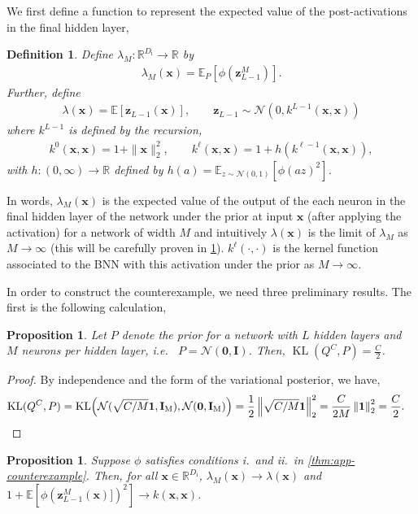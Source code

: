 \documentclass[twoside]{article}
\renewcommand{\ss}[1]{_{\text{#1}}}
\newcommand{\vnull}{\mathbf{0}}
\newcommand{\vx}{\mathbf{x}}
\newcommand{\vz}{\mathbf{z}}
\newcommand{\mI}{\mathbf{I}}
\newcommand{\E}{\mathbb{E}}
\renewcommand{\P}{\mathbb{P}}
\newcommand{\Q}{\mathbb{Q}}
\renewcommand{\Q}{\ensuremath{Q}}
\renewcommand{\P}{\ensuremath{P}}
\newcommand{\R}{\mathbb{R}}
\newcommand{\KL}{\operatorname{KL}}
\newcommand{\Normal}{\mathcal{N}}
\renewcommand{\ss}[1]{_{\text{#1}}}        %
\DeclarePairedDelimiter\parens{(}{)}             %
\theoremstyle{theoremstyle}
\newtheorem{definition}[theorem]{Definition}
\newtheorem{proposition}[theorem]{Proposition}
\begin{document}
We first define a function to represent the expected value of the post-activations in the final hidden layer,
\begin{definition}
Define $ \lambda_M\colon \R^{D\ss{i}} \to \R$ by
\begin{align}
    \lambda_M(\vx) = \E_{\P}[\phi(\vz_{L-1}^{M})].
\end{align}
Further, define
\begin{align}
    \lambda(\vx) = \E[
    \vz_{L-1}(\vx)], \qquad \vz_{L-1} \sim \Normal(0, k^{L-1}(\vx,\vx))
\end{align}
where $k^{L-1}$ is defined by the recursion,
\begin{align}\label{eqn:kernel-recursion}
    k^0(\vx,\vx) = 1 + \|\vx\|^2_2, \qquad k^{\ell}(\vx,\vx) = 1 + h(k^{\ell-1}(\vx,\vx)),
\end{align}
with $h\colon (0,\infty) \to \R$ defined by $h(a) = \E_{z\sim \Normal(0,1)}[\phi(az)^2]$. 
\end{definition}
In words, $\lambda_M(\vx)$ is the expected value of the output of the each neuron in the final hidden layer of the network under the prior at input $\vx$ (after applying the activation) for a network of width $M$ and intuitively $\lambda(\vx)$ is the limit of $\lambda_M$ as $M \to \infty$ (this will be carefully proven in \cref{prop:convergence-lambda}). $k^\ell(\cdot, \cdot)$ is the kernel function associated to the BNN with this activation under the prior as $M \to \infty$.


In order to construct the counterexample, we need three preliminary results. The first is the following calculation, 

\begin{proposition}
\label{prop:kl-to-prior}
Let $\P$ denote the prior for a network with $L$ hidden layers and $M$ neurons per hidden layer, i.e.~ $\P = \Normal(\vnull, \mI)$. Then, $\KL(\Q^C,\P) = \tfrac{C}{2}$.
\end{proposition}
\begin{proof}
By independence  and the form of the variational posterior, we have, 
\begin{align}
\KL(\Q^C,\P) 
&= \KL\parens*{\Normal(\sqrt{C/M}\mathbf{1}, \mI\ss{M}),\Normal(\vnull, \mI\ss{M})}
= \frac{1}{2}\left\|\sqrt{C/M}\mathbf{1}\right\|_2^2 
= \frac{C}{2M}\left\|\mathbf{1}\right\|_2^2 
= \frac{C}{2}. \qedhere
\end{align}
\end{proof}


\begin{proposition}\label{prop:convergence-lambda}
    Suppose $\phi$ satisfies conditions i.\ and ii.\ in \cref{thm:app-counterexample}.
    Then, for all $\vx \in \R^{D\ss{i}}$,
    $\lambda_M(\vx ) \to \lambda(\vx )$ and $1 + \E[\phi(\vz_{L-1}^{M}(\vx)])^2] \to k(\vx, \vx)$.
\end{proposition}
\end{document}
